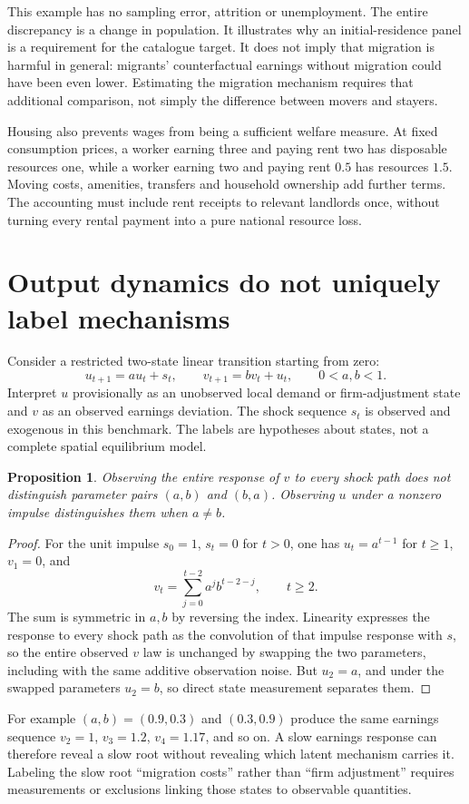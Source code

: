 \documentclass[11pt,a4paper]{article}
\newtheorem{proposition}[theorem]{Proposition}
\begin{document}
This example has no sampling error, attrition or unemployment. The entire discrepancy is a change in population. It illustrates why an initial-residence panel is a requirement for the catalogue target. It does not imply that migration is harmful in general: migrants' counterfactual earnings without migration could have been even lower. Estimating the migration mechanism requires that additional comparison, not simply the difference between movers and stayers.

Housing also prevents wages from being a sufficient welfare measure. At fixed consumption prices, a worker earning three and paying rent two has disposable resources one, while a worker earning two and paying rent $0.5$ has resources $1.5$. Moving costs, amenities, transfers and household ownership add further terms. The accounting must include rent receipts to relevant landlords once, without turning every rental payment into a pure national resource loss.

\section{Output dynamics do not uniquely label mechanisms}
Consider a restricted two-state linear transition starting from zero:
\[
 u_{t+1}=a u_t+s_t,\qquad
 v_{t+1}=b v_t+u_t,\qquad 0<a,b<1.
\tag{3}
\]
Interpret $u$ provisionally as an unobserved local demand or firm-adjustment state and $v$ as an observed earnings deviation. The shock sequence $s_t$ is observed and exogenous in this benchmark. The labels are hypotheses about states, not a complete spatial equilibrium model.
\begin{proposition}
Observing the entire response of $v$ to every shock path does not distinguish parameter pairs $(a,b)$ and $(b,a)$. Observing $u$ under a nonzero impulse distinguishes them when $a\ne b$.
\end{proposition}
\begin{proof}
For the unit impulse $s_0=1$, $s_t=0$ for $t>0$, one has $u_t=a^{t-1}$ for $t\ge1$, $v_1=0$, and
\[
 v_t=\sum_{j=0}^{t-2}a^j b^{t-2-j},\qquad t\ge2.
\]
The sum is symmetric in $a,b$ by reversing the index. Linearity expresses the response to every shock path as the convolution of that impulse response with $s$, so the entire observed $v$ law is unchanged by swapping the two parameters, including with the same additive observation noise. But $u_2=a$, and under the swapped parameters $u_2=b$, so direct state measurement separates them.
\end{proof}
For example $(a,b)=(0.9,0.3)$ and $(0.3,0.9)$ produce the same earnings sequence $v_2=1$, $v_3=1.2$, $v_4=1.17$, and so on. A slow earnings response can therefore reveal a slow root without revealing which latent mechanism carries it. Labeling the slow root ``migration costs'' rather than ``firm adjustment'' requires measurements or exclusions linking those states to observable quantities.
\end{document}

